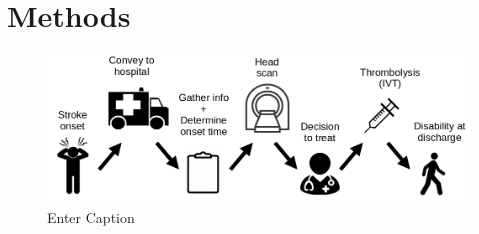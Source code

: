 \section{Methods}

\begin{figure}
    \centering
    \includegraphics[width=0.75\linewidth]{images/flow}
    \caption{Enter Caption}
    \label{flow}
\end{figure}